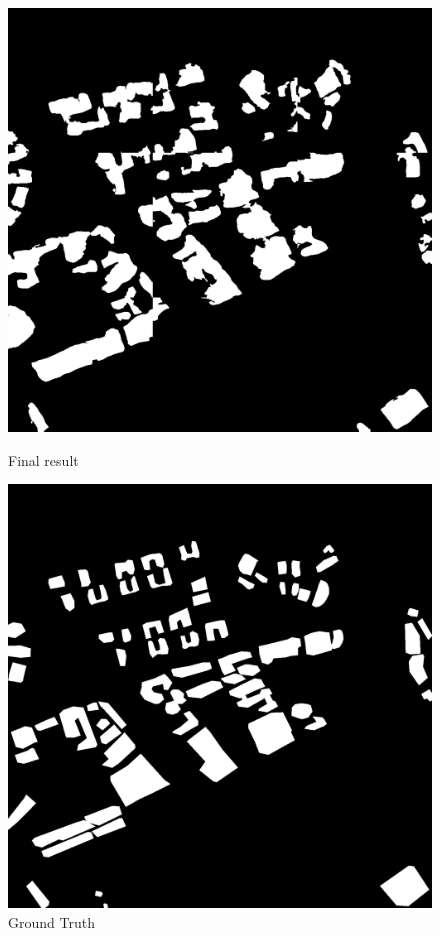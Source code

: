 \documentclass[]{IEEEtran}
\begin{document}


\newpage


\begin{figure}
	\vspace{0.5cm}
		\centering
		\includegraphics[width=0.7\columnwidth]{fw}
		\caption{Final result}
		\label{fig:fw}
	\vspace{0.3cm}
		\centering
		\includegraphics[width=0.7\columnwidth]{rt}
		\caption{Ground Truth}
		\label{fig:rt}
\end{figure}





\end{document}

